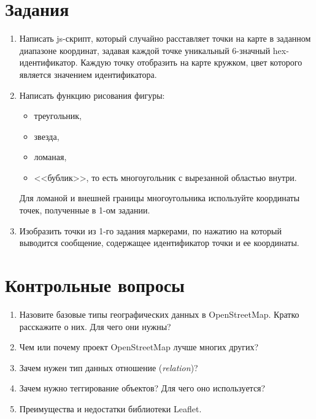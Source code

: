 \section{Задания}
\begin{enumerate}
    \item Написать js-скрипт, который случайно расставляет точки на карте 
        в заданном диапазоне координат, задавая каждой точке уникальный 
        6-значный hex-идентификатор. Каждую точку отобразить на карте 
        кружком, цвет которого является значением идентификатора.
    \item Написать функцию рисования фигуры:
    \begin{itemize}
        \item треугольник,
        \item звезда,
        \item ломаная,
        \item <<бублик>>, то есть многоугольник с вырезанной областью внутри.
    \end{itemize}
    Для ломаной и внешней границы многоугольника используйте координаты точек,
    полученные в 1-ом задании.
    \item Изобразить точки из 1-го задания маркерами, по нажатию на который 
        выводится сообщение, содержащее идентификатор точки и ее координаты.
\end{enumerate}

\newpage

\section{Контрольные вопросы}
\begin{enumerate}
    \item Назовите базовые типы географических данных в OpenStreetMap. 
        Кратко расскажите о них. Для чего они нужны?
    \item Чем или почему проект OpenStreetMap лучше многих других?
    \item Зачем нужен тип данных отношение (\emph{relation})?
    \item Зачем нужно теггирование объектов? Для чего оно используется?
    \item Преимущества и недостатки библиотеки Leaflet.
\end{enumerate}

\newpage

